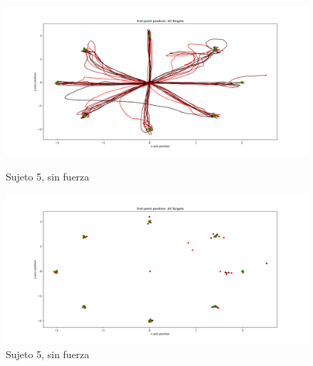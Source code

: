 \documentclass[a4paper,11pt, oneside]{book}
\begin{document}
\begin{figure}[H]
	\begin{minipage}[b]{0.5\linewidth}
		\centering
		\includegraphics[width=\linewidth]{sujeto5/no_force/trayectorias}
		\caption{Sujeto 5, sin fuerza}
		\label{5-fase1-1}
	\end{minipage}
	\hspace{0.5cm}
	\begin{minipage}[b]{0.5\linewidth}
		\centering
		\includegraphics[width=\linewidth]{sujeto5/no_force/trayectorias_puntos}
		\caption{Sujeto 5, sin fuerza}
		\label{5-fase1-2}
	\end{minipage}
\end{figure}
\end{document}
